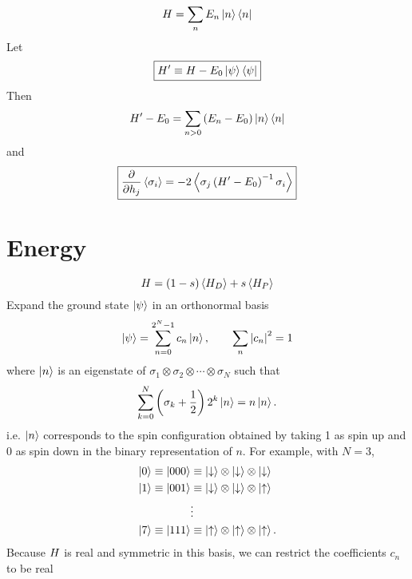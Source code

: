 \begin{equation}
  H = \sum_n E_n \left| n \right> \left< n \right|
  \label{}
\end{equation}
Let
\begin{equation}
  \boxed{
  H^{\prime} \equiv H - E_0 \left| \psi \right> \left< \psi \right|
  }
  \label{}
\end{equation}
Then
\begin{equation}
  H^{\prime} - E_0 = \sum_{n>0} \left( E_n - E_0 \right) \left| n \right> \left< n \right|
  \label{}
\end{equation}
and
\begin{equation}
  \boxed{
  \frac{\partial }{\partial h_j} \left< \sigma_i \right>
  = -2 \left< \sigma_j \left( H^{\prime} - E_0 \right)^{-1} \sigma_i \right>
  }
  \label{}
\end{equation}

\section*{Energy}
\begin{equation}
  H = (1 - s) \left< H_D \right> + s \left< H_P \right>
  \label{}
\end{equation}
Expand the ground state $\left| \psi \right>$ in an orthonormal basis
\begin{equation}
  \left| \psi \right> = \sum_{n=0}^{2^N-1} c_n \left| n \right>,
  \qquad
  \sum_n \left| c_n \right|^2 = 1
  \label{}
\end{equation}
where $\left| n \right>$ is an eigenstate of
$\sigma_1 \otimes \sigma_2 \otimes \cdots \otimes \sigma_N$
such that
\begin{equation}
    \sum_{k=0}^N \left( \sigma_k + \frac{1}{2} \right) 2^k \left| n \right> = n \left| n \right>.
  \label{}
\end{equation}
i.e. $\left| n \right>$ corresponds to the spin configuration obtained by taking 1
as spin up and 0 as spin down in the binary representation of $n$.
For example, with $N=3$,
\begin{align*}
  \left| 0 \right> \equiv \left| 000 \right>
  &\equiv
  \left| \downarrow \right> \otimes
  \left| \downarrow \right> \otimes
  \left| \downarrow \right> \\
  \left| 1 \right> \equiv \left| 001 \right>
  &\equiv
  \left| \downarrow \right> \otimes
  \left| \downarrow \right> \otimes
  \left| \uparrow \right> \\
  &\vdots \\
  \left| 7 \right> \equiv \left| 111 \right>
  &\equiv
  \left| \uparrow \right> \otimes
  \left| \uparrow \right> \otimes
  \left| \uparrow \right>.
  \label{}
\end{align*}
Because $H$ is real and symmetric in this basis, we can restrict the
coefficients $c_n$ to be real
